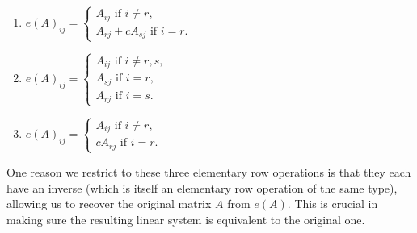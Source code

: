 \documentclass[12pt,letterpaper,reqno]{article}
\numberwithin{equation}{section}
\begin{document}
\begin{enumerate}
	\item $e(A)_{ij}=\begin{cases}
		A_{ij} \text{ if } i \neq r, \\
		A_{rj}+c A_{sj} \text{ if } i = r.
	\end{cases}$
	\item $e(A)_{ij}=\begin{cases}
		A_{ij} \text{ if } i \neq r,s, \\
		A_{sj} \text{ if } i = r, \\
		A_{rj} \text{ if } i=s.
	\end{cases}$
	\item $e(A)_{ij}=\begin{cases}
		A_{ij} \text{ if } i \neq r, \\
		cA_{rj} \text{ if } i = r.
	\end{cases}$
\end{enumerate}

One reason we restrict to these three elementary row operations is that they each have an inverse (which is itself an elementary row operation of the same type), allowing us to recover the original matrix $A$ from $e(A)$. This is crucial in making sure the resulting linear system is equivalent to the original one.
\end{document}
